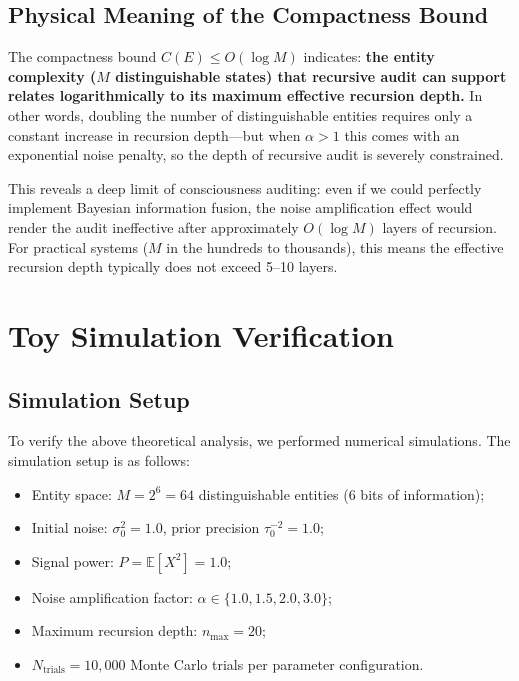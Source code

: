 \documentclass[12pt,a4paper]{article}
\theoremstyle{definition}
\newcommand{\E}{\mathbb{E}}
\begin{document}
\subsection{Physical Meaning of the Compactness Bound}

\noindent
The compactness bound $C(E) \leq O(\log M)$ indicates: \textbf{the entity complexity ($M$ distinguishable states) that recursive audit can support relates logarithmically to its maximum effective recursion depth.} In other words, doubling the number of distinguishable entities requires only a constant increase in recursion depth---but when $\alpha > 1$ this comes with an exponential noise penalty, so the depth of recursive audit is severely constrained.

This reveals a deep limit of consciousness auditing: even if we could perfectly implement Bayesian information fusion, the noise amplification effect would render the audit ineffective after approximately $O(\log M)$ layers of recursion. For practical systems ($M$ in the hundreds to thousands), this means the effective recursion depth typically does not exceed 5--10 layers.

\section{Toy Simulation Verification}

\subsection{Simulation Setup}

\noindent
To verify the above theoretical analysis, we performed numerical simulations. The simulation setup is as follows:
\begin{itemize}
    \item Entity space: $M = 2^6 = 64$ distinguishable entities (6 bits of information);
    \item Initial noise: $\sigma_0^2 = 1.0$, prior precision $\tau_0^{-2} = 1.0$;
    \item Signal power: $P = \E[X^2] = 1.0$;
    \item Noise amplification factor: $\alpha \in \{1.0, 1.5, 2.0, 3.0\}$;
    \item Maximum recursion depth: $n_{\max} = 20$;
    \item $N_{\text{trials}} = 10{,}000$ Monte Carlo trials per parameter configuration.
\end{itemize}
\end{document}
